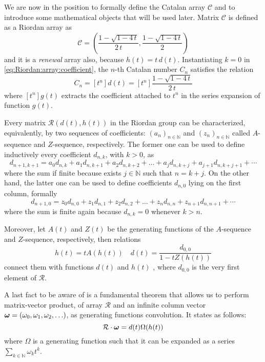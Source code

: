We are now in the position to formally define the Catalan
array $\mathcal{C}$ and to introduce some mathematical objects
that will be used later. Matrix $\mathcal{C}$ is defined 
as a Riordan array as
\begin{displaymath}
    \mathcal{C}=\left(\frac{1-\sqrt{1-4\,t}}{2\,t},
        \frac{1-\sqrt{1-4\,t}}{2}\right)
\end{displaymath}
and it is a \emph{renewal} array \cite{rogers:1977} also, because $h(t)=t\,d(t)$.
Instantiating $k=0$ in \autoref{eq:Riordan:array:coefficient},
the $n$-th Catalan number $C_{n}$ satisfies the relation
\begin{displaymath}
    C_{n} = [t^{n}]d(t)= [t^{n}]\frac{1-\sqrt{1-4\,t}}{2\,t}
\end{displaymath}
where $[t^{n}]g(t)$ extracts the coefficient attached to $t^{n}$ 
in the series expansion of function $g(t)$.

Every matrix $\mathcal{R}(d(t), h(t))$ in the Riordan group can be characterized, equivalently,
by two sequences of coefficients: $\left(a_{n}\right)_{n\in\mathbb{N}}$  and
$\left(z_{n}\right)_{n\in\mathbb{N}}$ called $A$-sequence and $Z$-sequence, 
respectively. The former one can be used to define inductively every coefficient $d_{n,k}$, with $k>0$, as 
\begin{equation}
    d_{n+1, k+1} = a_{0}d_{n,k} + a_{1}d_{n,k+1} + a_{2}d_{n,k+2} + \ldots + a_{j}d_{n,k+j} + a_{j+1}d_{n,k+j+1} + \cdots
\end{equation}
where the sum if finite because exists $j\in\mathbb{N}$ such that $n=k+j$. On the other hand, the latter one
can be used to define coefficients $d_{n,0}$ lying on the first column, formally
\begin{equation}
    d_{n+1, 0} = z_{0}d_{n,0} + z_{1}d_{n,1} + z_{2}d_{n,2} + \ldots + z_{n}d_{n,n} + z_{n+1}d_{n,n+1} + \cdots
\end{equation}
where the sum is finite again because $d_{n,k}=0$ whenever $k>n$.

Moreover, let $A(t)$ and $Z(t)$ be the generating functions of the $A$-sequence and $Z$-sequence, respectively,
then relations 
\begin{equation}
    h(t) = tA(h(t)) \quad d(t)=\frac{d_{0,0}}{1-tZ(h(t))}
\end{equation}
connect them with functions $d(t)$ and $h(t)$ \cite{merlini:some:alternative:characterizations:1997},
where $d_{0,0}$ is the very first element %
of $\mathcal{R}$.

A last fact to be aware of is a fundamental theorem that allows us to perform 
matrix-vector product, of array $\mathcal{R}$ and an infinite column vector 
$\boldsymbol{\omega}=(\omega_{0},\omega_{1},\omega_{2},\ldots)$,
as generating functions convolution. It states as follows:
\begin{equation}
    \mathcal{R}\cdot\boldsymbol{\omega} = d(t)\Omega(h(t))    
\end{equation}
where $\Omega$ is a generating function such that it can be expanded 
as a series $\sum_{k\in\mathbb{N}}{\omega_{k}t^{k}}$.

